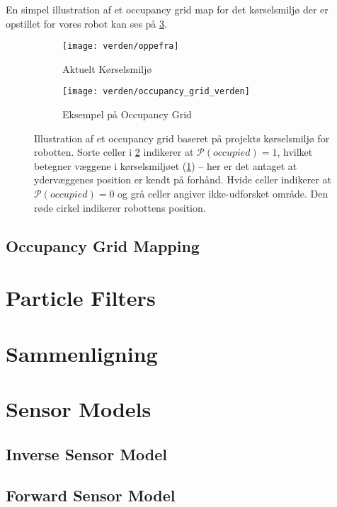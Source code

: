 En simpel illustration af et occupancy grid map for det kørselsmiljø der er opstillet for vores robot kan ses på \cref{map:approx_occupancy_grid}.

\begin{figure}[h] %
\centering
	\begin{subfigure}[b]{.45\textwidth}
	\centering
	\texttt{[image: verden/oppefra]}
	\caption{Aktuelt Kørselsmiljø}
	\label{map:world}
	\end{subfigure}
	\begin{subfigure}[b]{.45\textwidth}
	\centering
	\texttt{[image: verden/occupancy\_grid\_verden]}
	\caption{Eksempel på Occupancy Grid}
	\label{map:occupancy_grid}
	\end{subfigure}
\caption{Illustration af et occupancy grid baseret på projekts kørselsmiljø for robotten. Sorte celler i \cref{map:occupancy_grid} indikerer at $\mathcal{P}(occupied) = 1$, hvilket betegner væggene i kørselsmiljøet (\cref{map:world}) -- her er det antaget at ydervæggenes position er kendt på forhånd. Hvide celler indikerer at $\mathcal{P}(occupied) = 0$ og grå celler angiver ikke-udforsket område. Den røde cirkel indikerer robottens position.}
\label{map:approx_occupancy_grid}
\end{figure}

\subsection{Occupancy Grid Mapping}


\section{Particle Filters}

\section{Sammenligning}

\section{Sensor Models}

\subsection{Inverse Sensor Model}

\subsection{Forward Sensor Model	}

\